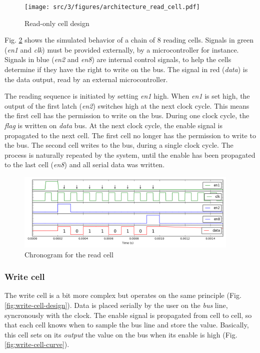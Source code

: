 \begin{figure}[!h]
  \centering
  \texttt{[image: src/3/figures/architecture\_read\_cell.pdf]}
  \caption{Read-only cell design}
  \label{fig:read-cell-design}
\end{figure}

Fig. \ref{fig:read-cell-curve} shows the simulated behavior of a chain of 8 reading cells.
Signals in green (\textit{en1} and \textit{clk}) must be provided externally, by a microcontroller for instance.
Signals in blue (\textit{en2} and \textit{en8}) are internal control signals, to help the cells determine if they have the right to write on the bus.
The signal in red (\textit{data}) is the data output, read by an external microcontroller.

The reading sequence is initiated by setting \textit{en1} high.
When \textit{en1} is set high, the output of the first latch (\textit{en2}) switches high at the next clock cycle.
This means the first cell has the permission to write on the bus.
During one clock cycle, the \textit{flag} is written on \textit{data} bus.
At the next clock cycle, the enable signal is propagated to the next cell.
The first cell no longer has the permission to write to the bus.
The second cell writes to the bus, during a single clock cycle.
The process is naturally repeated by the system, until the enable has been propagated to the last cell (\textit{en8}) and all serial data was written.

\begin{figure}[!h]
  \centering
  \includegraphics[width=0.95\textwidth]{src/3/figures/curve_read_cell.png}
  \caption{Chronogram for the read cell}
  \label{fig:read-cell-curve}
\end{figure}

\subsubsection{Write cell}

The write cell is a bit more complex but operates on the same principle (Fig. \ref{fig:write-cell-design}).
Data is placed serially by the user on the \textit{bus} line, syncronously with the clock.
The enable signal is propagated from cell to cell, so that each cell knows when to sample the bus line and store the value.
Basically, this cell sets on its \textit{output} the value on the bus when its enable is high (Fig. \ref{fig:write-cell-curve}).


